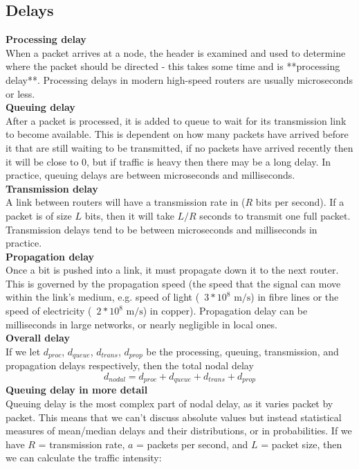 \subsection{Delays}
\textbf{Processing delay}\\
When a packet arrives at a node, the header is examined and used to determine where the packet should be directed - this takes some time and is **processing delay**. Processing delays in modern high-speed routers are usually microseconds or less.\\
\textbf{Queuing delay}\\
After a packet is processed, it is added to queue to wait for its transmission link to become available. This is dependent on how many packets have arrived before it that are still waiting to be transmitted, if no packets have arrived recently then it will be close to 0, but if traffic is heavy then there may be a long delay. In practice, queuing delays are between microseconds and milliseconds.\\
\textbf{Transmission delay}\\
A link between routers will have a transmission rate in ($R$ bits per second). If a packet is of size $L$ bits, then it will take $L/R$ seconds to transmit one full packet. Transmission delays tend to be between microseconds and milliseconds in practice.\\
\textbf{Propagation delay}\\
Once a bit is pushed into a link, it must propagate down it to the next router. This is governed by the propagation speed (the speed that the signal can move within the link's medium, e.g. speed of light (~$3*10^8\text{ m/s}$) in fibre lines or the speed of electricity (~$2*10^8\text{ m/s}$) in copper). Propagation delay can be milliseconds in large networks, or nearly negligible in local ones.\\
\textbf{Overall delay}\\
If we let $d_{proc}$, $d_{queue}$, $d_{trans}$, $d_{prop}$ be the processing, queuing, transmission, and propagation delays respectively, then the total nodal delay
$$d_{nodal}=d_{proc}+d_{queue}+d_{trans}+d_{prop}$$
\textbf{Queuing delay in more detail}\\
Queuing delay is the most complex part of nodal delay, as it varies packet by packet. This means that we can't discuss absolute values but instead statistical measures of mean/median delays and their distributions, or in probabilities.
If we have $R$ = transmission rate, $a$ = packets per second, and $L$ = packet size, then we can calculate the traffic intensity:
